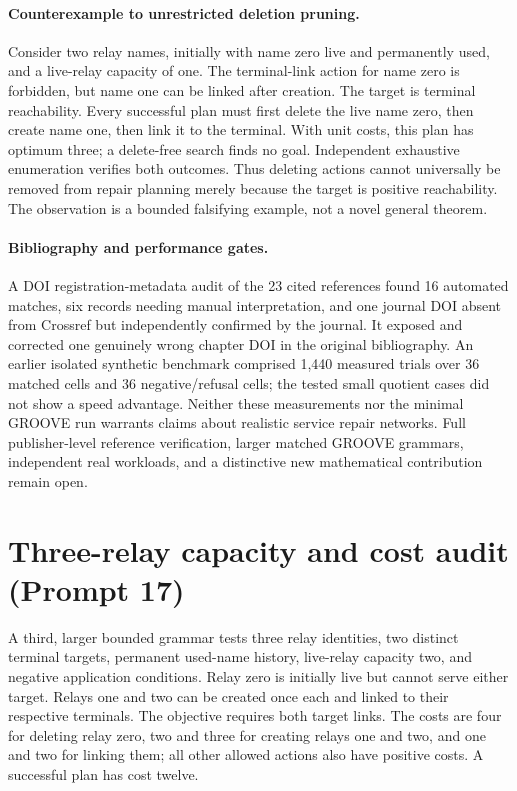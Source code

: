 \documentclass[11pt,a4paper]{article}
\begin{document}
\paragraph{Counterexample to unrestricted deletion pruning.}
Consider two relay names, initially with name zero live and permanently used, and a live-relay capacity of one. The terminal-link action for name zero is forbidden, but name one can be linked after creation. The target is terminal reachability. Every successful plan must first delete the live name zero, then create name one, then link it to the terminal. With unit costs, this plan has optimum three; a delete-free search finds no goal. Independent exhaustive enumeration verifies both outcomes. Thus deleting actions cannot universally be removed from repair planning merely because the target is positive reachability. The observation is a bounded falsifying example, not a novel general theorem.

\paragraph{Bibliography and performance gates.}
A DOI registration-metadata audit of the 23 cited references found 16 automated matches, six records needing manual interpretation, and one journal DOI absent from Crossref but independently confirmed by the journal. It exposed and corrected one genuinely wrong chapter DOI in the original bibliography. An earlier isolated synthetic benchmark comprised 1,440 measured trials over 36 matched cells and 36 negative/refusal cells; the tested small quotient cases did not show a speed advantage. Neither these measurements nor the minimal GROOVE run warrants claims about realistic service repair networks. Full publisher-level reference verification, larger matched GROOVE grammars, independent real workloads, and a distinctive new mathematical contribution remain open.


\section{Three-relay capacity and cost audit (Prompt 17)}
\label{sec:three-relay}
A third, larger bounded grammar tests three relay identities, two distinct terminal targets, permanent used-name history, live-relay capacity two, and negative application conditions. Relay zero is initially live but cannot serve either target. Relays one and two can be created once each and linked to their respective terminals. The objective requires both target links. The costs are four for deleting relay zero, two and three for creating relays one and two, and one and two for linking them; all other allowed actions also have positive costs. A successful plan has cost twelve.
\end{document}
